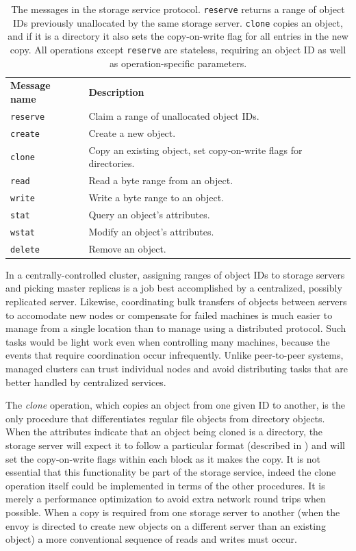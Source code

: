 \begin{table}[tp]
\begin{center}
\begin{tabular}{lp{8cm}}
\textbf{Message name} & \textbf{Description} \\
\texttt{reserve} & Claim a range of unallocated object IDs. \\
\texttt{create} & Create a new object. \\
\texttt{clone} & Copy an existing object, set copy-on-write flags for directories. \\
\texttt{read} & Read a byte range from an object. \\
\texttt{write} & Write a byte range to an object. \\
\texttt{stat} & Query an object's attributes. \\
\texttt{wstat} & Modify an object's attributes. \\
\texttt{delete} & Remove an object. \\
\end{tabular}
\end{center}
\caption[Additional message in the storage service protocol]{The messages in the storage service protocol. \texttt{reserve} returns a range of object IDs previously unallocated by the same storage server. \texttt{clone} copies an object, and if it is a directory it also sets the copy-on-write flag for all entries in the new copy. All operations except \texttt{reserve} are stateless, requiring an object ID as well as operation-specific parameters.}
\label{tab:storage-messages}
\end{table}

In a centrally-controlled cluster, assigning ranges of object IDs to storage servers and picking master replicas is a job best accomplished by a centralized, possibly replicated server. Likewise, coordinating bulk transfers of objects between servers to accomodate new nodes or compensate for failed machines is much easier to manage from a single location than to manage using a distributed protocol. Such tasks would be light work even when controlling many machines, because the events that require coordination occur infrequently. Unlike peer-to-peer systems, managed clusters can trust individual nodes and avoid distributing tasks that are better handled by centralized services.

The \emph{clone} operation, which copies an object from one given ID to another, is the only procedure that differentiates regular file objects from directory objects. When the attributes indicate that an object being cloned is a directory, the storage server will expect it to follow a particular format (described in ) and will set the copy-on-write flags within each block as it makes the copy. It is not essential that this functionality be part of the storage service, indeed the clone operation itself could be implemented in terms of the other procedures. It is merely a performance optimization to avoid extra network round trips when possible. When a copy is required from one storage server to another (when the envoy is directed to create new objects on a different server than an existing object) a more conventional sequence of reads and writes must occur.


